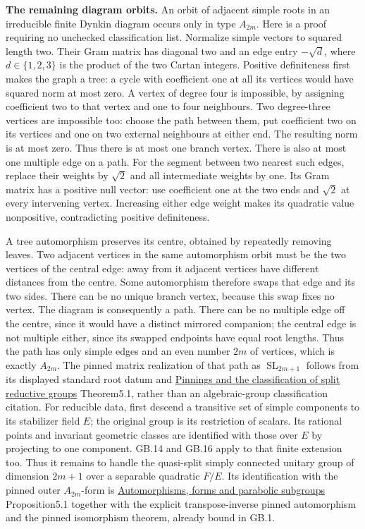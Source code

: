 \documentclass[
  11pt,
]{article}
\begin{document}
\textbf{The remaining diagram orbits.} An orbit of adjacent simple roots
in an irreducible finite Dynkin diagram occurs only in type \(A_{2m}\).
Here is a proof requiring no unchecked classification list. Normalize
simple vectors to squared length two. Their Gram matrix has diagonal two
and an edge entry \(-\sqrt{d}\), where \(d\in\{1,2,3\}\) is the product
of the two Cartan integers. Positive definiteness first makes the graph
a tree: a cycle with coefficient one at all its vertices would have
squared norm at most zero. A vertex of degree four is impossible, by
assigning coefficient two to that vertex and one to four neighbours. Two
degree-three vertices are impossible too: choose the path between them,
put coefficient two on its vertices and one on two external neighbours
at either end. The resulting norm is at most zero. Thus there is at most
one branch vertex. There is also at most one multiple edge on a path.
For the segment between two nearest such edges, replace their weights by
\(\sqrt2\) and all intermediate weights by one. Its Gram matrix has a
positive null vector: use coefficient one at the two ends and \(\sqrt2\)
at every intervening vertex. Increasing either edge weight makes its
quadratic value nonpositive, contradicting positive definiteness.

A tree automorphism preserves its centre, obtained by repeatedly
removing leaves. Two adjacent vertices in the same automorphism orbit
must be the two vertices of the central edge: away from it adjacent
vertices have different distances from the centre. Some automorphism
therefore swaps that edge and its two sides. There can be no unique
branch vertex, because this swap fixes no vertex. The diagram is
consequently a path. There can be no multiple edge off the centre, since
it would have a distinct mirrored companion; the central edge is not
multiple either, since its swapped endpoints have equal root lengths.
Thus the path has only simple edges and an even number \(2m\) of
vertices, which is exactly \(A_{2m}\). The pinned matrix realization of
that path as \(\operatorname{SL}_{2m+1}\) follows from its displayed
standard root datum and \href{../AG-RG/AG-RG-05.html}{Pinnings and the
classification of split reductive groups} Theorem5.1, rather than an
algebraic-group classification citation. For reducible data, first
descend a transitive set of simple components to its stabilizer field
\(E\); the original group is its restriction of scalars. Its rational
points and invariant geometric classes are identified with those over
\(E\) by projecting to one component. GB.14 and GB.16 apply to that
finite extension too. Thus it remains to handle the quasi-split simply
connected unitary group of dimension \(2m+1\) over a separable quadratic
\(F/E\). Its identification with the pinned outer \(A_{2m}\)-form is
\href{../AG-RG/AG-RG-06.html}{Automorphisms, forms and parabolic
subgroups} Proposition5.1 together with the explicit transpose-inverse
pinned automorphism and the pinned isomorphism theorem, already bound in
GB.1.
\end{document}
